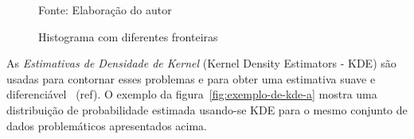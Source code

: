 \documentclass[12pt,a4paper]{article}
\newcommand{\source}[1]{\vspace{-10pt} \caption*{Fonte: {#1}} }
\begin{document}
\begin{figure}[ht]
{  }
  \qquad %
  \caption{Histograma com diferentes fronteiras}
  \label{fig:exemplo-de-histograma}
  \source{Elaboração do autor}
\end{figure}

As \textit{Estimativas de Densidade de Kernel} (Kernel Density Estimators - KDE) são usadas para contornar esses problemas e para obter uma estimativa suave e diferenciável~ (ref). O exemplo da figura~\ref{fig:exemplo-de-kde-a} mostra uma distribuição de probabilidade estimada usando-se KDE para o mesmo conjunto de dados problemáticos apresentados acima.
\end{document}
